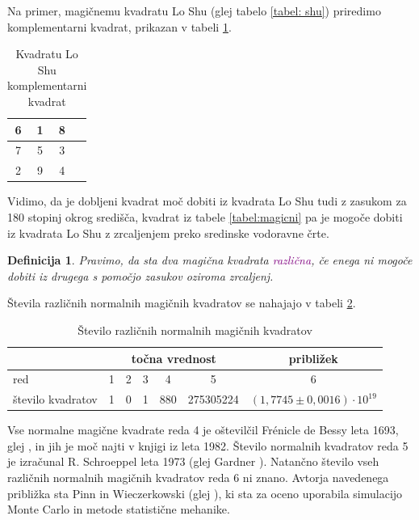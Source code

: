\documentclass[a4paper,12pt]{article}
\newtheorem{definition}{Definicija}
\begin{document}
Na primer, magičnemu kvadratu Lo Shu (glej tabelo \ref{tabel: shu}) priredimo
komplementarni kvadrat, prikazan v tabeli \ref{table:closhu}.

\begin{table}[h!]
   \centering
   \caption{Kvadratu Lo Shu komplementarni kvadrat}
   \label{table:closhu}
   \begin{tabular}{|c|c|c|c|}
   \hline
      6 & 1 & 8 \\\hline
      7 & 5 & 3 \\\hline
      2 & 9 & 4 \\\hline
   \end{tabular}
\end{table}


Vidimo, da je dobljeni kvadrat moč dobiti iz kvadrata Lo Shu tudi z zasukom za
180 stopinj okrog središča, kvadrat iz tabele \ref{tabel:magicni} pa je mogoče dobiti
iz kvadrata Lo Shu z zrcaljenjem preko sredinske vodoravne črte.
\newpage



 \begin{definition}
      Pravimo, da sta dva magična kvadrata \textcolor{purple}{različna}, če enega ni mogoče dobiti
      iz drugega s pomočjo zasukov oziroma zrcaljenj.
 \end{definition}

Števila različnih normalnih magičnih kvadratov se nahajajo v tabeli \ref{table:stevila}.

\begin{table}[h]
   \centering
    \caption{Število različnih normalnih magičnih kvadratov}
    \label{table:stevila}
    \begin{tabular}{lcccccc}
        \toprule
        & \multicolumn{5}{c}{točna vrednost} & približek \\ 
        \midrule
        red & 1 & 2 & 3 & 4 & 5 & 6 \\
        število kvadratov & 1 & 0 & 1 & 880 & 275305224 & $(1,7745 \pm 0,0016) \cdot 10^{19}$ \\ 
        \bottomrule
    \end{tabular}
\end{table}
Vse normalne magične kvadrate reda 4 je oštevilčil Frénicle de Bessy
leta 1693, glej \cite{bessy1693}, in jih je moč najti v knjigi \cite{berlekamp1982}
iz leta 1982. Število normalnih kvadratov reda 5 je izračunal
R. Schroeppel leta 1973 (glej Gardner \cite{gardner1976}).
Natančno število vseh različnih normalnih magičnih kvadratov reda 6 ni znano.
Avtorja navedenega približka sta Pinn in Wieczerkowski (glej \cite{pinn1998}), ki
sta za oceno uporabila simulacijo Monte Carlo in metode statistične mehanike.
\end{document}
